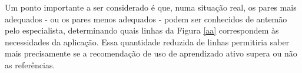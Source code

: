 Um ponto importante a ser considerado é que, numa situação real, os pares mais adequados - ou os pares menos adequados - podem ser conhecidos de antemão pelo especialista, determinando quais linhas da Figura \ref{aa} correspondem às necessidades da aplicação.
Essa quantidade reduzida de linhas permitiria saber mais precisamente se a recomendação de uso de aprendizado ativo supera ou não as referências.
